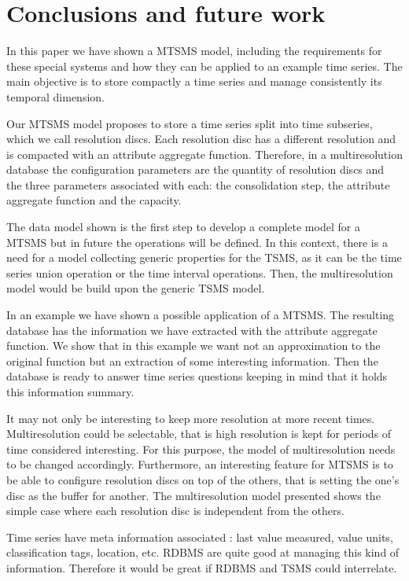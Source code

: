 \section{Conclusions and future work} 

In this paper we have shown a MTSMS model, including the requirements
for these special systems and how they can be applied to an example
time series. The main objective is to store compactly a time series
and manage consistently its temporal dimension.

Our MTSMS model proposes to store a time series split into time
subseries, which we call resolution discs.  Each resolution disc has a
different resolution and is compacted with an attribute aggregate
function. Therefore, in a multiresolution database the configuration
parameters are the quantity of resolution discs and the three
parameters associated with each: the consolidation step, the attribute
aggregate function and the capacity.

The data model shown is the first step to develop a complete model for
a MTSMS but in future the operations will be defined. In this context,
there is a need for a model collecting generic properties for the
TSMS, as it can be the time series union operation or the time
interval operations. Then, the multiresolution model would be build
upon the generic TSMS model.

In an example we have shown a possible application of a MTSMS. The
resulting database has the information we have extracted with the
attribute aggregate function. We show that in this example we want
not an approximation to the original function but an extraction of
some interesting information. Then the database is ready to answer
time series questions keeping in mind that it holds this information
summary.

It may not only be interesting to keep more resolution at more recent
times. Multiresolution could be selectable, that is high resolution is
kept for periods of time considered interesting. For this purpose, the
model of multiresolution needs to be changed accordingly. Furthermore,
an interesting feature for MTSMS is to be able to configure resolution
discs on top of the others, that is setting the one's disc as the
buffer for another. The multiresolution model presented shows the
simple case where each resolution disc is independent from the others.

Time series have meta information associated \cite{dreyer94}: last
value measured, value units, classification tags, location, etc. RDBMS
are quite good at managing this kind of information. Therefore it
would be great if RDBMS and TSMS could interrelate.

